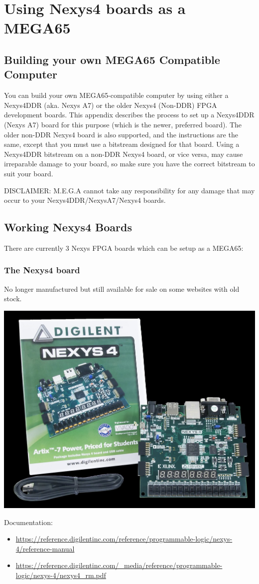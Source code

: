 \chapter{Using Nexys4 boards as a MEGA65}

\section{Building your own MEGA65 Compatible Computer}

You can build your own MEGA65-compatible computer by using either a Nexys4DDR (aka. Nexys A7) or the older Nexys4 (Non-DDR) FPGA development boards.
This appendix describes the process to set up a Nexys4DDR (Nexys A7) board for this purpose (which is the newer, preferred board).
The older non-DDR Nexys4 board is also supported, and the instructions are the same, except that
you must use a bitstream designed for that board.
Using a Nexys4DDR bitstream on a non-DDR Nexys4 board, or vice versa, may cause irreparable damage to your board, so make sure
you have the correct bitstream to suit your board.


DISCLAIMER: M.E.G.A cannot take any responsibility for any damage that may occur to your Nexys4DDR/NexysA7/Nexys4 boards.

\newpage

\section{Working Nexys4 Boards}

There are currently 3 Nexys FPGA boards which can be setup as a MEGA65:

\begin{minipage}{\linewidth}
  \subsection{The Nexys4 board}

  No longer manufactured but still available for sale on some websites with old stock.

  \begin{center}
    \includegraphics[width=0.4\linewidth]{images/img001_nexys4_board.jpg}
  \end{center}

  Documentation:

  \begin{itemize}
    \item \url{https://reference.digilentinc.com/reference/programmable-logic/nexys-4/reference-manual}
    \item \url{https://reference.digilentinc.com/\_media/reference/programmable-logic/nexys-4/nexys4\_rm.pdf}
  \end{itemize}
\end{minipage}

